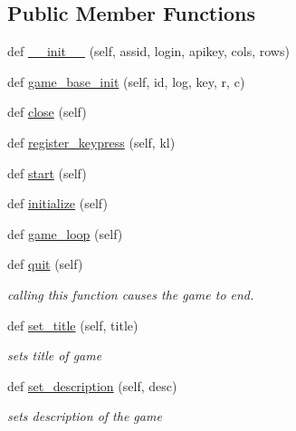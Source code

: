 \subsection*{Public Member Functions}
\begin{DoxyCompactItemize}
\item 
def \hyperlink{classbridges_1_1gamebase_1_1_game_base_a869c20436a432429580f1a4e5fb63b9e}{\+\_\+\+\_\+init\+\_\+\+\_\+} (self, assid, login, apikey, cols, rows)
\item 
def \hyperlink{classbridges_1_1gamebase_1_1_game_base_a35f5bb45ff3f02267a03809a12d301c7}{game\+\_\+base\+\_\+init} (self, id, log, key, r, c)
\item 
def \hyperlink{classbridges_1_1gamebase_1_1_game_base_aa30b096b3b2834d36a05acd982625517}{close} (self)
\item 
def \hyperlink{classbridges_1_1gamebase_1_1_game_base_ac60243e192a502fb7be51f86eb5b76b6}{register\+\_\+keypress} (self, kl)
\item 
def \hyperlink{classbridges_1_1gamebase_1_1_game_base_a05a30fccf88c2baba1137b5a06ba2ed7}{start} (self)
\item 
def \hyperlink{classbridges_1_1gamebase_1_1_game_base_a336629d190f1601f1211ca57e4d5427d}{initialize} (self)
\item 
def \hyperlink{classbridges_1_1gamebase_1_1_game_base_af650eeb756558d2cbcae43c74de5cce7}{game\+\_\+loop} (self)
\item 
def \hyperlink{classbridges_1_1gamebase_1_1_game_base_a21742d4e630fa64dc76848c7b4fcb344}{quit} (self)
\begin{DoxyCompactList}\small\item\em calling this function causes the game to end. \end{DoxyCompactList}\item 
def \hyperlink{classbridges_1_1gamebase_1_1_game_base_a7e7d4033c4b191b3699dbf0cb5f25933}{set\+\_\+title} (self, title)
\begin{DoxyCompactList}\small\item\em sets title of game \end{DoxyCompactList}\item 
def \hyperlink{classbridges_1_1gamebase_1_1_game_base_a75ecd56daf08036207772d6ce81c90b1}{set\+\_\+description} (self, desc)
\begin{DoxyCompactList}\small\item\em sets description of the game \end{DoxyCompactList}\item 

\end{DoxyCompactItemize}
